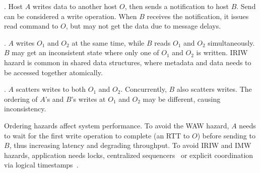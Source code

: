 .
Host $A$ writes data to another host $O$, then sends a notification to host $B$. Send can be considered a write operation.
When $B$ receives the notification, it issues read command to $O$, but may not get the data due to message delays.


.
$A$ writes $O_1$ and $O_2$ at the same time, while $B$ reads $O_1$ and $O_2$ simultaneously. $B$ may get an inconsistent state where only one of $O_1$ and $O_2$ is written. IRIW hazard is common in shared data structures, where metadata and data needs to be accessed together atomically. %

.
$A$ scatters writes to both $O_1$ and $O_2$. Concurrently, $B$ also scatters writes. The ordering of $A$'s and $B$'s writes at $O_1$ and $O_2$ may be different, causing inconsistency. %

Ordering hazards affect system performance. To avoid the WAW hazard, $A$ needs to wait for the first write operation to complete (an RTT to $O$) before sending to $B$, thus increasing latency and degrading throughput. To avoid IRIW and IMW hazards, application needs locks, centralized sequencers~\cite{kaminsky2016design} or explicit coordination via logical timestamps~\cite{lamport1978time}.



